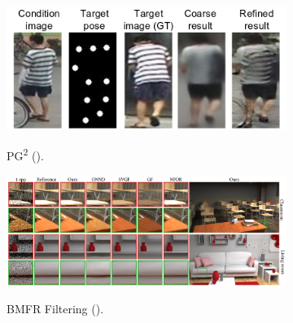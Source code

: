 \documentclass{article}
\begin{document}
\begin{figure}[h!]
\centering
\begin{subfigure}{0.45\textwidth}
\begin{center}
\begin{minipage}[t]{0.855\linewidth}
\begin{centering}
{\includegraphics[width=\linewidth]{pg2_results.png}}
\caption{PG\textsuperscript{2} (\cite{pose_guided_image_generation}).}\label{fig:pose_guided_image_generation}
\end{centering}
\end{minipage}
\end{center}
\end{subfigure}
\begin{subfigure}{0.45\textwidth}
\begin{center}
\begin{minipage}[t]{0.95\linewidth}
\begin{centering}
{\includegraphics[width=\linewidth]{bmfr.png}}
\caption{BMFR Filtering (\cite{path_tracing}).}
\label{fig:path_tracing}
\end{centering}
\end{minipage}
\end{center}
\end{subfigure}
\begin{subfigure}{0.45\textwidth}
\begin{center}
\begin{minipage}[t]{0.95\linewidth}

\end{minipage}
\end{center}
\end{subfigure}
\end{figure}
\end{document}
